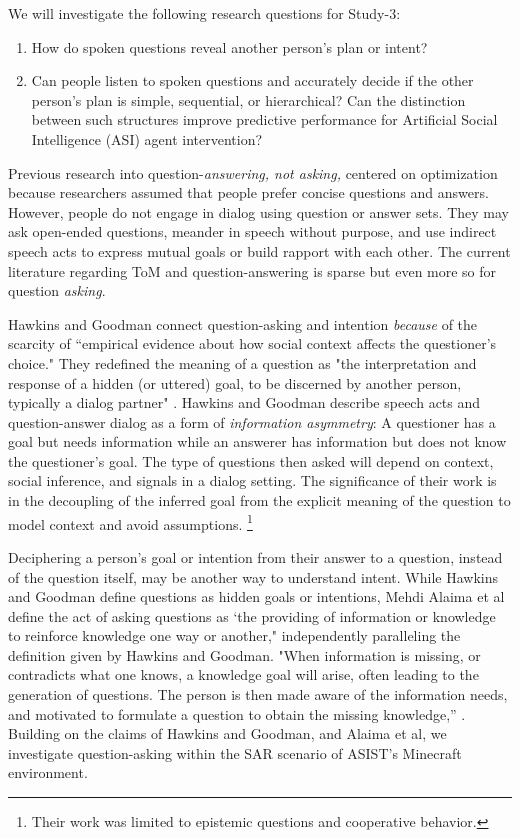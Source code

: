 \documentclass[10pt]{article}
\begin{document}
We will investigate the following research questions for Study-3:

\begin{enumerate}
    \item How do spoken questions reveal another person’s plan or intent? 
    \item Can people listen to spoken questions and accurately decide if the other person's plan
        is simple, sequential, or hierarchical? Can the distinction between such
        structures improve predictive performance for Artificial Social
        Intelligence (ASI) agent intervention?
\end{enumerate}

Previous research into question-\emph{answering, not asking,} centered on optimization because researchers assumed that people prefer concise questions and answers. However, people do not engage in dialog using question or answer sets. They may ask open-ended questions, meander in speech without purpose, and use indirect speech acts to express mutual goals or build rapport with each other. The current literature regarding ToM and question-answering is sparse but even more so for question \emph{asking}. 

Hawkins and Goodman connect question-asking and intention \emph{because} of the scarcity of “empirical evidence about how social context affects the questioner’s choice." They redefined the meaning of a question as "the interpretation and response of a hidden (or uttered) goal, to be discerned by another person, typically a dialog partner" \citep{hawkins_goodman_2017}. Hawkins and Goodman describe speech acts and question-answer dialog as a form of \emph{information asymmetry}: A questioner has a goal but needs information while an answerer has information but does not know the questioner’s goal. The type of questions then asked will depend on context, social inference, and signals in a dialog setting. The significance of their work is in the decoupling of the inferred goal from the explicit meaning of the question to model context and avoid assumptions. \footnote{Their work was limited to epistemic questions and cooperative behavior.}

Deciphering a person’s goal or intention from their answer to a question, instead of the question itself, may be another way to understand intent. While Hawkins and Goodman define questions as hidden goals or intentions, Mehdi Alaima et al define the act of asking questions as ‘the providing of information or knowledge to reinforce knowledge one way or another," independently paralleling the definition given by Hawkins and Goodman. "When information is missing, or contradicts what one knows, a knowledge goal will arise, often leading to the generation of questions. The person is then made aware of the information needs, and motivated to formulate a question to obtain the missing knowledge,” \citep{alaimi_2020}. Building on the claims of Hawkins and Goodman, and Alaima et al, we investigate question-asking within the SAR scenario of ASIST’s Minecraft environment. 
\end{document}
